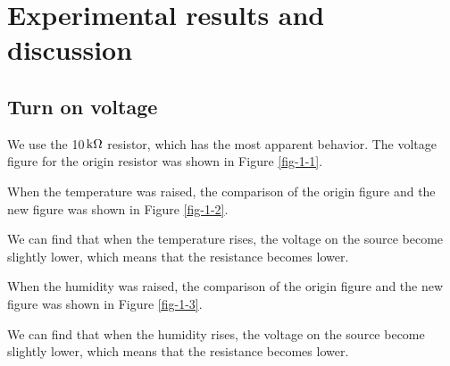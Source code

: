 \documentclass{article}
\newcommand{\unit}[1]{{\rm\,#1}}
\begin{document}
\newpage

\section{Experimental results and discussion}

\subsection{Turn on voltage}



We use the 10$\unit{k\Omega}$ resistor, which has the most apparent behavior. The voltage figure for the origin resistor was shown in Figure \ref{fig-1-1}.


When the temperature was raised, the comparison of the origin figure and the new figure was shown in Figure \ref{fig-1-2}.


We can find that when the temperature rises, the voltage on the source become slightly lower, which means that the resistance becomes lower.

\newpage
When the humidity was raised, the comparison of the origin figure and the new figure was shown in Figure \ref{fig-1-3}.


We can find that when the humidity rises, the voltage on the source become slightly lower, which means that the resistance becomes lower.
\end{document}
